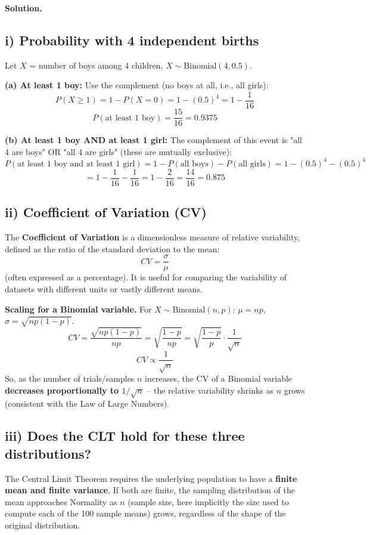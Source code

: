 \documentclass[11pt]{article}
\newcommand{\soln}{\par\noindent\textcolor{acolor}{\textbf{Solution.}}\quad}
\begin{document}
\soln

\subsection*{i) Probability with 4 independent births}
Let $X$ = number of boys among 4 children, $X \sim \text{Binomial}(4, 0.5)$.

\textbf{(a) At least 1 boy:} Use the complement (no boys at all, i.e., all girls):
\[
P(X\ge 1) = 1-P(X=0) = 1-(0.5)^4 = 1-\frac{1}{16}
\]
\[
\boxed{P(\text{at least 1 boy}) = \frac{15}{16} = 0.9375}
\]

\textbf{(b) At least 1 boy AND at least 1 girl:} The complement of this event is "all 4 are boys" OR "all 4 are girls" (these are mutually exclusive):
\[
P(\text{at least 1 boy and at least 1 girl}) = 1 - P(\text{all boys}) - P(\text{all girls}) = 1-(0.5)^4-(0.5)^4
\]
\[
\boxed{= 1-\frac{1}{16}-\frac{1}{16} = 1-\frac{2}{16} = \frac{14}{16} = 0.875}
\]

\subsection*{ii) Coefficient of Variation (CV)}
The \textbf{Coefficient of Variation} is a dimensionless measure of relative variability, defined as the ratio of the standard deviation to the mean:
\[
CV = \frac{\sigma}{\mu}
\]
(often expressed as a percentage). It is useful for comparing the variability of datasets with different units or vastly different means.

\textbf{Scaling for a Binomial variable.} For $X\sim\text{Binomial}(n,p)$: $\mu = np$, $\sigma = \sqrt{np(1-p)}$.
\[
CV = \frac{\sqrt{np(1-p)}}{np} = \sqrt{\frac{1-p}{np}} = \sqrt{\frac{1-p}{p}}\cdot\frac{1}{\sqrt{n}}
\]
\[
\boxed{CV \propto \frac{1}{\sqrt{n}}}
\]
So, as the number of trials/samples $n$ increases, the CV of a Binomial variable \textbf{decreases proportionally to $1/\sqrt{n}$} -- the relative variability shrinks as $n$ grows (consistent with the Law of Large Numbers).

\subsection*{iii) Does the CLT hold for these three distributions?}
The Central Limit Theorem requires the underlying population to have a \textbf{finite mean and finite variance}. If both are finite, the sampling distribution of the mean approaches Normality as $n$ (sample size, here implicitly the size used to compute each of the 100 sample means) grows, regardless of the shape of the original distribution.
\end{document}
